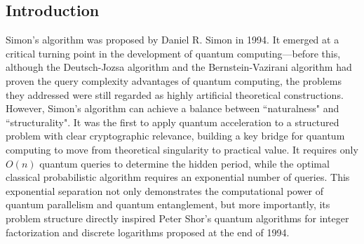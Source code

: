 \documentclass[a4paper,twocolumn,11pt,unpublished]{quantumarticle}
\numberwithin{equation}{section}
\begin{document}
\subsection{Introduction}
Simon's algorithm was proposed by Daniel R. Simon in 1994. It emerged at a critical turning point in the development of quantum computing—before this, although the Deutsch-Jozsa algorithm and the Bernstein-Vazirani algorithm had proven the query complexity advantages of quantum computing, the problems they addressed were still regarded as highly artificial theoretical constructions. However, Simon's algorithm can achieve a balance between ``naturalness" and ``structurality". It was the first to apply quantum acceleration to a structured problem with clear cryptographic relevance, building a key bridge for quantum computing to move from theoretical singularity to practical value. It requires only $O(n)$ quantum queries to determine the hidden period, while the optimal classical probabilistic algorithm requires an exponential number of queries. This exponential separation not only demonstrates the computational power of quantum parallelism and quantum entanglement, but more importantly, its problem structure directly inspired Peter Shor's quantum algorithms for integer factorization and discrete logarithms proposed at the end of 1994.
\end{document}
